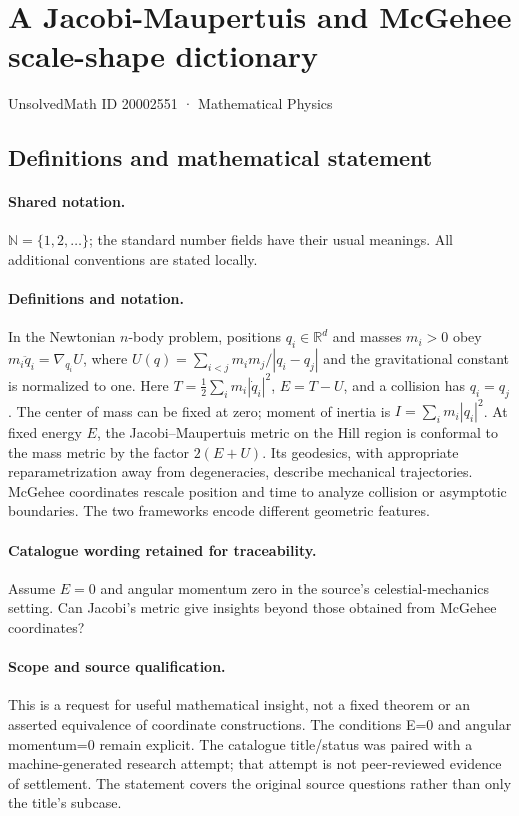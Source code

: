\documentclass[11pt]{article}
\begin{document}
\setcounter{section}{20002550}
\section{A Jacobi-Maupertuis and McGehee scale-shape dictionary}\label{20002551}
{\small UnsolvedMath ID 20002551 · Mathematical Physics}
\subsection{Definitions and mathematical statement}

\paragraph{Shared notation.}$\mathbb N=\{1,2,\ldots\}$; the standard number fields have their usual meanings. All additional conventions are stated locally.


\paragraph{Definitions and notation.}In the Newtonian $n$-body problem, positions $q_i\in\mathbb R^d$ and masses $m_i>0$ obey $m_i\ddot q_i=\nabla_{q_i}U$, where $U(q)=\sum_{i<j}m_im_j/|q_i-q_j|$ and the gravitational constant is normalized to one. Here $T=\tfrac12\sum_i m_i|\dot q_i|^2$, $E=T-U$, and a collision has $q_i=q_j$. The center of mass can be fixed at zero; moment of inertia is $I=\sum_i m_i|q_i|^2$. At fixed energy $E$, the Jacobi--Maupertuis metric on the Hill region is conformal to the mass metric by the factor $2(E+U)$. Its geodesics, with appropriate reparametrization away from degeneracies, describe mechanical trajectories. McGehee coordinates rescale position and time to analyze collision or asymptotic boundaries. The two frameworks encode different geometric features.

\paragraph{Catalogue wording retained for traceability.}
Assume $E=0$ and angular momentum zero in the source’s celestial-mechanics setting. Can Jacobi’s metric give insights beyond those obtained from McGehee coordinates?
\paragraph{Scope and source qualification.}This is a request for useful mathematical insight, not a fixed theorem or an asserted equivalence of coordinate constructions. The conditions E=0 and angular momentum=0 remain explicit. The catalogue title/status was paired with a machine-generated research attempt; that attempt is not peer-reviewed evidence of settlement. The statement covers the original source questions rather than only the title’s subcase.
\end{document}
